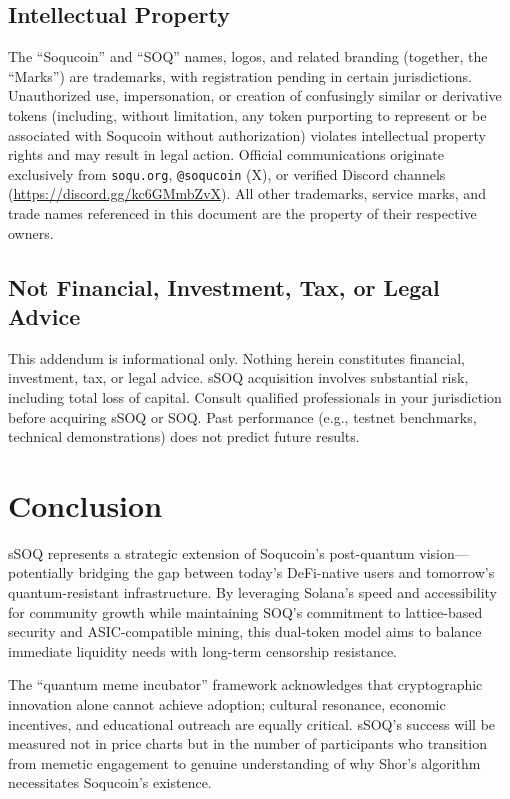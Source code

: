 \documentclass[10pt]{article}
\begin{document}
\subsection{Intellectual Property}

The ``Soqucoin'' and ``SOQ'' names, logos, and related branding (together, the ``Marks'') are trademarks, with registration pending in certain jurisdictions. Unauthorized use, impersonation, or creation of confusingly similar or derivative tokens (including, without limitation, any token purporting to represent or be associated with Soqucoin without authorization) violates intellectual property rights and may result in legal action. Official communications originate exclusively from \texttt{soqu.org}, \texttt{@soqucoin} (X), or verified Discord channels (\url{https://discord.gg/kc6GMmbZvX}). All other trademarks, service marks, and trade names referenced in this document are the property of their respective owners.

\subsection{Not Financial, Investment, Tax, or Legal Advice}

This addendum is informational only. Nothing herein constitutes financial, investment, tax, or legal advice. sSOQ acquisition involves substantial risk, including total loss of capital. Consult qualified professionals in your jurisdiction before acquiring sSOQ or SOQ. Past performance (e.g., testnet benchmarks, technical demonstrations) does not predict future results.

\section{Conclusion}

sSOQ represents a strategic extension of Soqucoin's post-quantum vision—potentially bridging the gap between today's DeFi-native users and tomorrow's quantum-resistant infrastructure. By leveraging Solana's speed and accessibility for community growth while maintaining SOQ's commitment to lattice-based security and ASIC-compatible mining, this dual-token model aims to balance immediate liquidity needs with long-term censorship resistance.

The ``quantum meme incubator'' framework acknowledges that cryptographic innovation alone cannot achieve adoption; cultural resonance, economic incentives, and educational outreach are equally critical. sSOQ's success will be measured not in price charts but in the number of participants who transition from memetic engagement to genuine understanding of why Shor's algorithm necessitates Soqucoin's existence.
\end{document}
